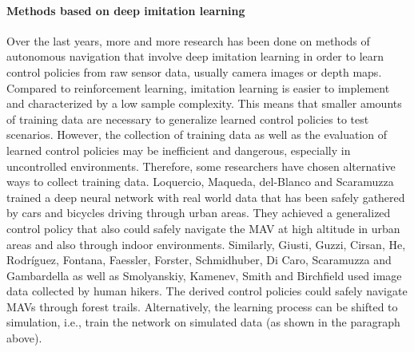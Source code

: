 \paragraph{Methods based on deep imitation learning}





Over the last years, more and more research has been done on methods of autonomous navigation
that involve deep imitation learning in order to learn control policies from raw sensor data, usually camera images or depth maps.  %
Compared to reinforcement learning, imitation learning is easier to implement and characterized by a low sample complexity. 
This means that smaller amounts of training data are necessary to generalize learned control policies to test scenarios.
However, the collection of training data as well as the evaluation of learned control policies
may be inefficient and dangerous, especially in uncontrolled environments.
Therefore, some researchers have chosen alternative ways to collect training data.
Loquercio, Maqueda, del-Blanco and Scaramuzza \cite{Loquercio2018} trained a deep neural network 
with real world data that has been safely gathered by cars and bicycles driving through urban areas.
They achieved a generalized control policy 
that also could safely navigate the MAV at high altitude in urban areas and also through indoor environments.
Similarly, Giusti, Guzzi, Cirsan, He, Rodríguez, Fontana, Faessler, Forster, Schmidhuber, Di Caro, Scaramuzza and Gambardella \cite{Giusti2016}
as well as Smolyanskiy, Kamenev, Smith and Birchfield \cite{Smolyanskiy2017} used image data collected by human hikers.
The derived control policies could safely navigate MAVs through forest trails.
Alternatively, the learning process can be shifted to simulation, i.e., train the network on simulated data (as shown in the paragraph above).

